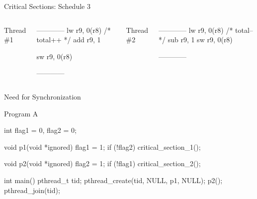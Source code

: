 \documentclass[11pt,aspectratio=169]{beamer}
\begin{document}
\begin{slide}{Critical Sections: Schedule 3}
\begin{columns}
    Thread \#1\\
    \begin{ccode}
------------
lw r9, 0(r8) /* total++ */
add r9, 1

sw r9, 0(r8)


------------
    \end{ccode}
    Thread \#2\\
    \begin{ccode}
------------
lw r9, 0(r8) /* total-- */
sub r9, 1
sw r9, 0(r8)



------------
    \end{ccode}
\end{columns}
\end{slide}

\begin{slide}{Need for Synchronization}
\end{slide}

\begin{slide}{\hypertarget{prog-a}{Program A}}
\vspace{-1em}
\begin{ccode}
   int flag1 = 0, flag2 = 0;

   void p1(void *ignored) {
     flag1 = 1;
     if (!flag2) { critical_section_1(); }
   }

   void p2(void *ignored) {
     flag2 = 1;
     if (!flag1) { critical_section_2(); }
   }

   int main() {
     pthread_t tid;
     pthread_create(tid, NULL, p1, NULL);
     p2(); pthread_join(tid);
   }
\end{ccode}
\end{slide}
\end{document}
